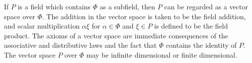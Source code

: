 If $P$ is a field which contains $\Phi$ as a subfield, then $P$ can be regarded as a vector space over $\Phi$. The addition in the vector space is taken to be the field addition, and scalar multiplication $\alpha \xi$ for $\alpha \in \Phi$ and $\xi \in P$ is defined to be the field product. The axioms of a vector space are immediate consequences of the associative and distributive laws and the fact that $\Phi$ contains the identity of $P$. The vector space $P$ over $\Phi$ may be infinite dimensional or finite dimensional.
